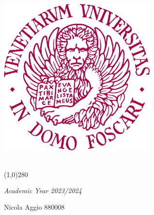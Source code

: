 \newcommand{\theoremNumBox}[2]{
\vspace{3mm} \begin{tcolorbox} \textbf{Theorem #1.} \textit{#2} \end{tcolorbox} \vspace{1mm}
}

\newcommand{\lemma}[2]{
\vspace{3mm} \textbf{Lemma #1.} \textit{#2} \vspace{1mm}
}

\newcommand{\lemmaName}[2]{
\vspace{3mm} \textbf{Lemma (#1).} \textit{#2} \vspace{1mm}
}

\newcommand{\claim}[1]{
\vspace{3mm} \textbf{Claim.} \textit{#1} \vspace{1mm}
}

\begin{titlepage}
	\begin{center}
		\includegraphics[width=0.6\textwidth]{unive}
		
		\vspace*{1cm}
		\LARGE
		
		\vspace{0.5cm}
		\Huge
		\textbf{\titolo}\\
		
		\line(1,0){280}
		
		\vspace{0.5cm}
		\large
		\textit{Academic Year 2023/2024}
		
		\vfill
		
	\end{center}
	\begin{raggedleft}
		\Large
		\large
		Nicola Aggio 880008\\
	\end{raggedleft}
\end{titlepage}

